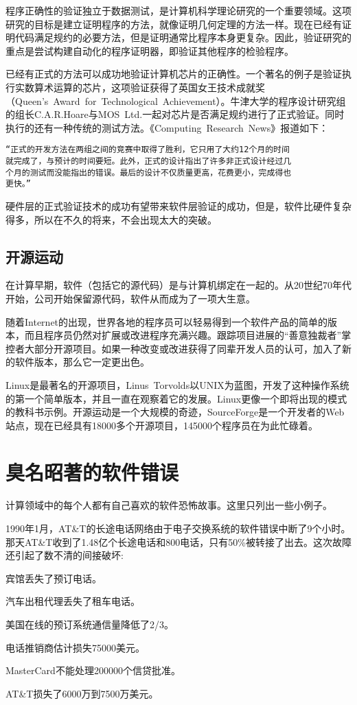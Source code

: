 程序正确性的验证独立于数据测试，是计算机科学理论研究的一个重要领域。这项研究的目标是建立证明程序的方法，就像证明几何定理的方法一样。现在已经有证明代码满足规约的必要方法，但是证明通常比程序本身更复杂。因此，验证研究的重点是尝试构建自动化的程序证明器，即验证其他程序的检验程序。

已经有正式的方法可以成功地验证计算机芯片的正确性。一个著名的例子是验证执行实数算术运算的芯片，这项验证获得了英国女王技术成就奖（Queen's~Award~for~Technological~Achievement）。牛津大学的程序设计研究组的组长C.A.R.Hoare与MOS~Ltd.一起对芯片是否满足规约进行了正式验证。同时执行的还有一种传统的测试方法。《Computing~Research~News》报道如下：
\begin{verbatim}
“正式的开发方法在两组之间的竞赛中取得了胜利，它只用了大约12个月的时间
就完成了，与预计的时间要短。此外，正式的设计指出了许多非正式设计经过几
个月的测试而没能指出的错误。最后的设计不仅质量更高，花费更小，完成得也
更快。”
\end{verbatim}
硬件层的正式验证技术的成功有望带来软件层验证的成功，但是，软件比硬件复杂得多，所以在不久的将来，不会出现太大的突破。

\subsection{开源运动}

在计算早期，软件（包括它的源代码）是与计算机绑定在一起的。从20世纪70年代开始，公司开始保留源代码，软件从而成为了一项大生意。

随着Internet的出现，世界各地的程序员可以轻易得到一个软件产品的简单的版本，而且程序员仍然对扩展或改进程序充满兴趣。跟踪项目进展的“善意独裁者”掌控者大部分开源项目。如果一种改变或改进获得了同辈开发人员的认可，加入了新的软件版本，那么它一定更出色。

Linux是最著名的开源项目，Linus~Torvolds以UNIX为蓝图，开发了这种操作系统的第一个简单版本，并且一直在观察着它的发展。Linux更像一个即将出现的模式的教科书示例。开源运动是一个大规模的奇迹，SourceForge是一个开发者的Web站点，现在已经具有18000多个开源项目，145000个程序员在为此忙碌着。


\section{臭名昭著的软件错误}

计算领域中的每个人都有自己喜欢的软件恐怖故事。这里只列出一些小例子。

1990年1月，AT\&T的长途电话网络由于电子交换系统的软件错误中断了9个小时。那天AT\&T收到了1.48亿个长途电话和800电话，只有50\%被转接了出去。这次故障还引起了数不清的间接破坏:
\begin{compactitem}
\item 宾馆丢失了预订电话。
\item 汽车出租代理丢失了租车电话。
\item 美国在线的预订系统通信量降低了2/3。
\item 电话推销商估计损失75000美元。
\item MasterCard不能处理200000个信贷批准。
\item AT\&T损失了6000万到7500万美元。
\end{compactitem}

